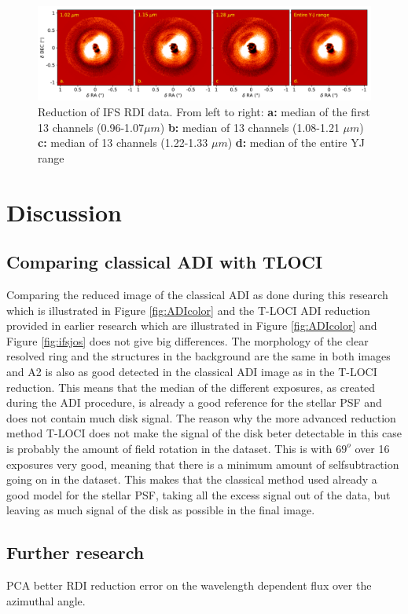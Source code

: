 \documentclass[twoside,single]{lion-msc}
\begin{document}
\begin{figure}[htb]
\centering
\includegraphics[trim={0cm 0cm 0cm 0cm},clip,width = \textwidth]{RDIwavelplot}
\caption{Reduction of IFS RDI data. From left to right: \textbf{a:} median of the first 13 channels (0.96-1.07$\mu m$) \textbf{b:} median of 13 channels (1.08-1.21 $\mu m$) \textbf{c:} median of 13 channels (1.22-1.33 $\mu m$) \textbf{d:} median of the entire YJ range}
\label{fig:RDIcolor}
\end{figure}

\chapter{Discussion}
\section{Comparing classical ADI with TLOCI}
Comparing the reduced image of the classical ADI as done during this research which is illustrated in Figure \ref{fig:ADIcolor} and the T-LOCI ADI reduction provided in earlier research which are illustrated in Figure \ref{fig:ADIcolor} and Figure \ref{fig:ifsjos} does not give big differences. The morphology of the clear resolved ring and the structures in the background are the same in both images and A2 is also as good detected in the classical ADI image as in the T-LOCI reduction. This means that the median of the different exposures, as created during the ADI procedure, is already a good reference for the stellar PSF and does not contain much disk signal. The reason why the more advanced reduction method T-LOCI does not make the signal of the disk beter detectable in this case is probably the amount of field rotation in the dataset. This is with $69^o$ over 16 exposures very good, meaning that there is a minimum amount of selfsubtraction going on in the dataset. This makes that the classical method used already a good model for the stellar PSF, taking all the excess signal out of the data, but leaving as much signal of the disk as possible in the final image.  

\section{Further research}
PCA
better RDI reduction
error on the wavelength dependent flux over the azimuthal angle.
\end{document}
